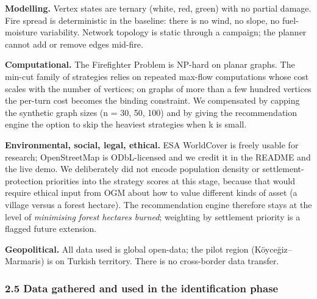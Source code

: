 \documentclass[
  11pt,
]{article}
\begin{document}
\textbf{Modelling.} Vertex states are ternary (white, red, green) with
no partial damage. Fire spread is deterministic in the baseline: there
is no wind, no slope, no fuel-moisture variability. Network topology is
static through a campaign; the planner cannot add or remove edges
mid-fire.

\textbf{Computational.} The Firefighter Problem is NP-hard on planar
graphs. The min-cut family of strategies relies on repeated max-flow
computations whose cost scales with the number of vertices; on graphs of
more than a few hundred vertices the per-turn cost becomes the binding
constraint. We compensated by capping the synthetic graph sizes (n = 30,
50, 100) and by giving the recommendation engine the option to skip the
heaviest strategies when k is small.

\textbf{Environmental, social, legal, ethical.} ESA WorldCover is freely
usable for research; OpenStreetMap is ODbL-licensed and we credit it in
the README and the live demo. We deliberately did not encode population
density or settlement-protection priorities into the strategy scores at
this stage, because that would require ethical input from OGM about how
to value different kinds of asset (a village versus a forest hectare).
The recommendation engine therefore stays at the level of
\emph{minimising forest hectares burned}; weighting by settlement
priority is a flagged future extension.

\textbf{Geopolitical.} All data used is global open-data; the pilot
region (Köyceğiz--Marmaris) is on Turkish territory. There is no
cross-border data transfer.

\subsubsection{2.5 Data gathered and used in the identification
phase}\label{data-gathered-and-used-in-the-identification-phase}
\end{document}
